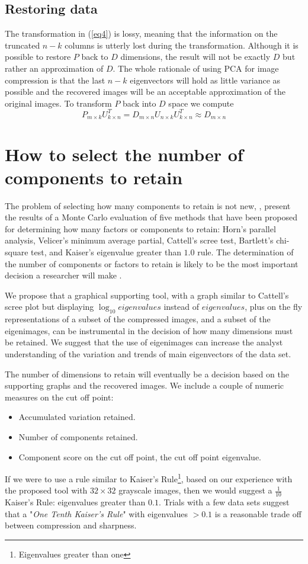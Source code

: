 \documentclass{article} %
\begin{document}
\subsection{Restoring data}
The transformation in (\ref{eq4}) is lossy, meaning that the information on the truncated $n-k$ columns is utterly lost during the transformation. Although it is possible to restore $P$ back to $D$ dimensions, the result will not be exactly $D$ but rather an approximation of $D$. The whole rationale of using PCA for image compression is that the last $n-k$ eigenvectors will hold as little variance as possible and the recovered images will be an acceptable approximation of the original images.
To transform $P$ back into $D$ space we compute \[P_{m\times k}U_{k\times n}^T = D_{m\times n}U_{n\times k}U_{k\times n}^T \approx D_{m\times n}\]
\section{How to select the number of components to retain}
The problem of selecting how many components to retain is not new, \citet{zwick1986comparison}, present the results of a Monte Carlo evaluation of five methods that have been proposed for determining how many factors or components to retain: Horn's parallel analysis, Velicer's minimum average partial, Cattell's scree test, Bartlett's chi-square test, and Kaiser's eigenvalue greater than $1.0$ rule. 
The determination of the number of components or factors to retain is likely to be the most important decision a researcher will make \citep{zwick1986comparison}.\par

We propose that a graphical supporting tool, with a graph similar to Cattell's scree plot but displaying $\log_{10} eigenvalues$ instead of $eigenvalues$, plus on the fly representations of a subset of the compressed images, and a subset of the eigenimages, can be instrumental in the decision of how many dimensions must be retained. We suggest that the use of eigenimages can increase the analyst understanding of the variation and trends of main eigenvectors of the data set.\par
The number of dimensions to retain will eventually be a decision based on the supporting graphs and the recovered images. We include a couple of numeric measures on the cut off point:
\begin{itemize}
\item Accumulated variation retained.
\item Number of components retained.
\item Component score on the cut off point, the cut off point eigenvalue.
\end{itemize}
If we were to use a rule similar to Kaiser's Rule\footnote{Eigenvalues greater than one}, based on our experience with the proposed tool with $32\times 32$ grayscale images, then we would suggest a $\frac{1}{10}$ Kaiser's Rule: eigenvalues greater than $0.1$. Trials with a few data sets suggest that a "\emph{One Tenth Kaiser's Rule}" with eigenvalues $> 0.1$ is a reasonable trade off between compression and sharpness.
\end{document}
